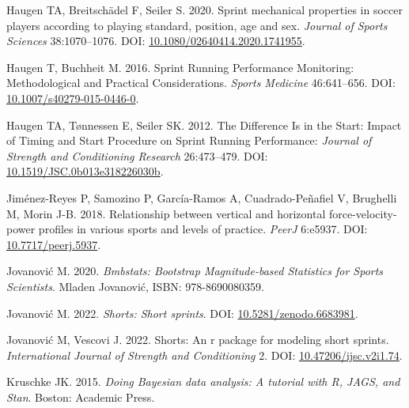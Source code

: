\documentclass[fleqn,10pt,lineno]{wlpeerj} %
\newlength{\cslhangindent}
\newlength{\cslentryspacingunit} %
\newenvironment{CSLReferences}[2] %
 {%
  \setlength{\parindent}{0pt}
  \ifodd #1
  \let\oldpar\par
  \def\par{\hangindent=\cslhangindent\oldpar}
  \fi
  \setlength{\parskip}{#2\cslentryspacingunit}
 }%
 {}
\begin{document}
\begin{CSLReferences}{1}{0}
\leavevmode{}%
Haugen TA, Breitschädel F, Seiler S. 2020. Sprint mechanical properties in soccer players according to playing standard, position, age and sex. \emph{Journal of Sports Sciences} 38:1070--1076. DOI: \href{https://doi.org/10.1080/02640414.2020.1741955}{10.1080/02640414.2020.1741955}.

\leavevmode{}%
Haugen T, Buchheit M. 2016. Sprint {Running Performance Monitoring}: {Methodological} and {Practical Considerations}. \emph{Sports Medicine} 46:641--656. DOI: \href{https://doi.org/10.1007/s40279-015-0446-0}{10.1007/s40279-015-0446-0}.

\leavevmode{}%
Haugen TA, Tønnessen E, Seiler SK. 2012. The {Difference Is} in the {Start}: {Impact} of {Timing} and {Start Procedure} on {Sprint Running Performance}: \emph{Journal of Strength and Conditioning Research} 26:473--479. DOI: \href{https://doi.org/10.1519/JSC.0b013e318226030b}{10.1519/JSC.0b013e318226030b}.

\leavevmode{}%
Jiménez-Reyes P, Samozino P, García-Ramos A, Cuadrado-Peñafiel V, Brughelli M, Morin J-B. 2018. Relationship between vertical and horizontal force-velocity-power profiles in various sports and levels of practice. \emph{PeerJ} 6:e5937. DOI: \href{https://doi.org/10.7717/peerj.5937}{10.7717/peerj.5937}.

\leavevmode{}%
Jovanović M. 2020. \emph{Bmbstats: {Bootstrap Magnitude}-based {Statistics} for {Sports Scientists}}. Mladen Jovanović, ISBN: 978-8690080359.

\leavevmode{}%
Jovanović M. 2022. \emph{Shorts: Short sprints}. DOI: \href{https://doi.org/10.5281/zenodo.6683981}{10.5281/zenodo.6683981}.

\leavevmode{}%
Jovanović M, Vescovi J. 2022. {\textbraceleft}Shorts{\textbraceright}: An r package for modeling short sprints. \emph{International Journal of Strength and Conditioning} 2. DOI: \href{https://doi.org/10.47206/ijsc.v2i1.74}{10.47206/ijsc.v2i1.74}.

\leavevmode{}%
Kruschke JK. 2015. \emph{Doing {Bayesian} data analysis: A tutorial with {R}, {JAGS}, and {Stan}}. {Boston}: {Academic Press}.


\end{CSLReferences}
\end{document}
